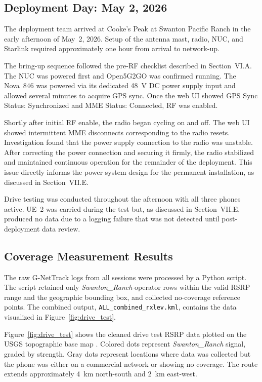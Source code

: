 \documentclass[
    left=1.5in,
    right=1.25in,
    top=1.25in,
    bottom=1.25in
]{CalPolySeniorProject}
\begin{document}
\subsection{Deployment Day: May 2, 2026}

The deployment team arrived at Cooke's Peak at Swanton Pacific Ranch in the
early afternoon of May~2, 2026. Setup of the antenna mast, radio, NUC, and
Starlink required approximately one hour from arrival to network-up.

The bring-up sequence followed the pre-RF checklist described in
Section~VI.A. The NUC was powered first and Open5G2GO was confirmed running.
The Nova~846 was powered via its dedicated 48~V DC power supply input and
allowed several minutes to acquire GPS sync. Once the web UI showed GPS Sync
Status: Synchronized and MME Status: Connected, RF was enabled.

Shortly after initial RF enable, the radio began
cycling on and off. The web UI showed intermittent MME disconnects corresponding
to the radio resets. Investigation found that the power supply connection to the
radio was unstable. After correcting the power connection and securing it firmly,
the radio stabilized and maintained continuous operation for the remainder of
the deployment. This issue directly informs the power system design for the
permanent installation, as discussed in Section~VII.E.

Drive testing was conducted throughout the afternoon with all three phones
active. UE~2 was carried during the test but, as discussed in Section~VII.E,
produced no data due to a logging failure that was not detected until
post-deployment data review.

\subsection{Coverage Measurement Results}

The raw G-NetTrack logs from all sessions were processed by
a Python script. The script retained only
\textit{Swanton\_Ranch}-operator rows within the valid RSRP range and the
geographic bounding box, and collected no-coverage reference points. The
combined output, \texttt{ALL\_combined\_rxlev.kml}, contains the data visualized
in Figure~\ref{fig:drive_test}.

Figure~\ref{fig:drive_test} shows the cleaned drive test RSRP data plotted on
the USGS topographic base map \autocite{usgs2026topo}. Colored dots represent
\textit{Swanton\_Ranch} signal, graded by strength. Gray dots represent
locations where data was collected but the phone was either on a commercial
network or showing no coverage. The route extends approximately 4~km
north-south and 2~km east-west.
\end{document}
